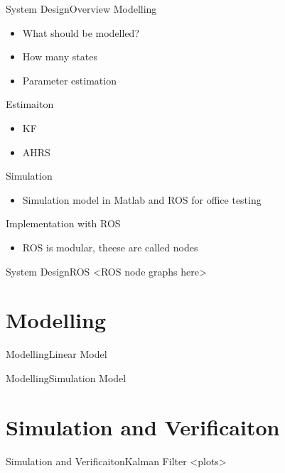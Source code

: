 \documentclass[10pt,handout]{beamer}
\begin{document}
\begin{frame}{System Design}{Overview}
Modelling
\begin{itemize}
\item What should be modelled?
\item How many states
\item Parameter estimation
\end{itemize}

Estimaiton
\begin{itemize}
\item KF
\item AHRS
\end{itemize}

Simulation
\begin{itemize}
\item Simulation model in Matlab and ROS for office testing
\end{itemize}

Implementation with ROS
\begin{itemize}
\item ROS is modular, theese are called nodes
\end{itemize}
\end{frame}

\begin{frame}{System Design}{ROS}
<ROS node graphs here>
\end{frame}

\section{Modelling}
\begin{frame}{Modelling}{Linear Model}

\end{frame}

\begin{frame}{Modelling}{Simulation Model}

\end{frame}

\section{Simulation and Verificaiton}
\begin{frame}{Simulation and Verificaiton}{Kalman Filter}
<plots>
\end{frame}
\end{document}
